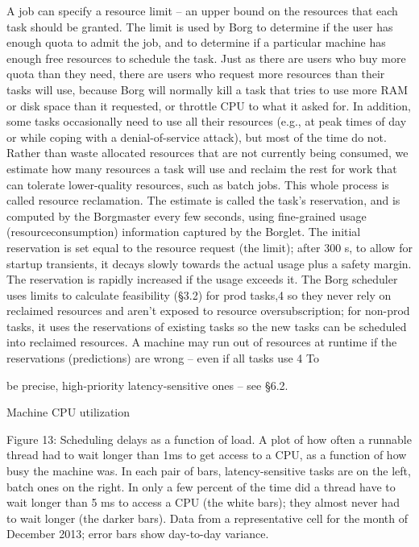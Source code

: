 A job can specify a resource limit – an upper bound on the
resources that each task should be granted. The limit is used
by Borg to determine if the user has enough quota to admit
the job, and to determine if a particular machine has enough
free resources to schedule the task. Just as there are users
who buy more quota than they need, there are users who
request more resources than their tasks will use, because
Borg will normally kill a task that tries to use more RAM
or disk space than it requested, or throttle CPU to what it
asked for. In addition, some tasks occasionally need to use
all their resources (e.g., at peak times of day or while coping
with a denial-of-service attack), but most of the time do not.
Rather than waste allocated resources that are not currently being consumed, we estimate how many resources a
task will use and reclaim the rest for work that can tolerate
lower-quality resources, such as batch jobs. This whole process is called resource reclamation. The estimate is called
the task’s reservation, and is computed by the Borgmaster every few seconds, using fine-grained usage (resourceconsumption) information captured by the Borglet. The initial reservation is set equal to the resource request (the limit);
after 300 s, to allow for startup transients, it decays slowly
towards the actual usage plus a safety margin. The reservation is rapidly increased if the usage exceeds it.
The Borg scheduler uses limits to calculate feasibility
(§3.2) for prod tasks,4 so they never rely on reclaimed resources and aren’t exposed to resource oversubscription; for
non-prod tasks, it uses the reservations of existing tasks so
the new tasks can be scheduled into reclaimed resources.
A machine may run out of resources at runtime if the
reservations (predictions) are wrong – even if all tasks use
4 To

be precise, high-priority latency-sensitive ones – see §6.2.

Machine CPU utilization

Figure 13: Scheduling delays as a function of load. A plot of how
often a runnable thread had to wait longer than 1ms to get access to
a CPU, as a function of how busy the machine was. In each pair of
bars, latency-sensitive tasks are on the left, batch ones on the right.
In only a few percent of the time did a thread have to wait longer
than 5 ms to access a CPU (the white bars); they almost never had
to wait longer (the darker bars). Data from a representative cell for
the month of December 2013; error bars show day-to-day variance.

